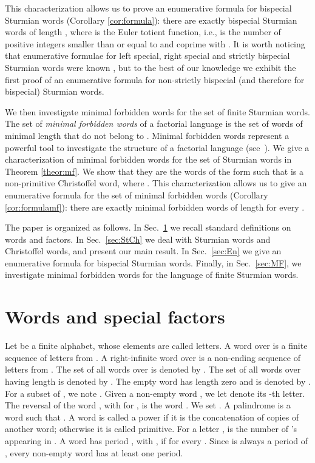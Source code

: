 \documentclass{llncs}
\begin{document}
This characterization allows us to prove an enumerative formula for bispecial Sturmian words (Corollary \ref{cor:formula}): there are exactly  bispecial Sturmian words of length , where  is the Euler totient function, i.e.,  is the number of positive integers smaller than or equal to  and coprime with . It is worth noticing that enumerative formulae for left special, right special and strictly bispecial Sturmian words were known \cite{DelMi94}, but to the best of our knowledge we exhibit the first proof of an enumerative formula for non-strictly bispecial (and therefore for bispecial) Sturmian words.

We then investigate minimal forbidden words for the set  of finite Sturmian words. The set of \emph{minimal forbidden words} of a factorial language  is the set of words of minimal length that do not belong to  \cite{MiReSci02}. Minimal forbidden words represent a powerful tool to investigate the structure of a factorial language (see~\cite{BeMiRe96}).
We give a characterization of minimal forbidden words for the set of Sturmian words in Theorem \ref{theor:mf}. We show that they are the words of the form  such that  is a non-primitive Christoffel word, where . This characterization allows us to give an enumerative formula for the set of minimal forbidden words (Corollary \ref{cor:formulamf}):  there are exactly  minimal forbidden words of length  for every .

The paper is organized as follows. In Sec.\ \ref{sec:wsf} we recall standard definitions on words and factors. In Sec.\ \ref{sec:StCh} we deal with Sturmian words and Christoffel words, and present our main result. In Sec.\ \ref{sec:En} we give an enumerative formula for bispecial Sturmian words. Finally, in Sec.\ \ref{sec:MF}, we investigate minimal forbidden words for the language of finite Sturmian words. 

\section{Words and special factors}\label{sec:wsf}


Let  be a finite alphabet, whose elements are called letters. A word over  is a finite sequence of letters from . A right-infinite word over  is a non-ending sequence of letters from . The set of all words over  is denoted by . The set of all words over  having length  is denoted by . The empty word has length zero and is denoted by . For a subset  of , we note . Given a non-empty word , we let  denote its -th letter. The reversal of the word , with  for , is the word . We set . A palindrome is a word  such that . A word is called a power if it is the concatenation of copies of another word; otherwise it is called primitive. For a letter ,  is the number of 's appearing in .  A word  has period , with , if  for every . Since  is always a period of , every non-empty word has at least one period. 
\end{document}

